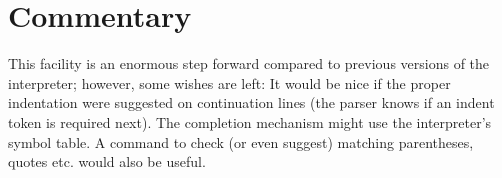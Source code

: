 \documentclass{manual}
\begin{document}
\section{Commentary}
\label{commentary}

This facility is an enormous step forward compared to previous
versions of the interpreter; however, some wishes are left: It would
be nice if the proper indentation were suggested on continuation lines
(the parser knows if an indent token is required next).  The
completion mechanism might use the interpreter's symbol table.  A
command to check (or even suggest) matching parentheses, quotes etc.
would also be useful.

\end{document}

